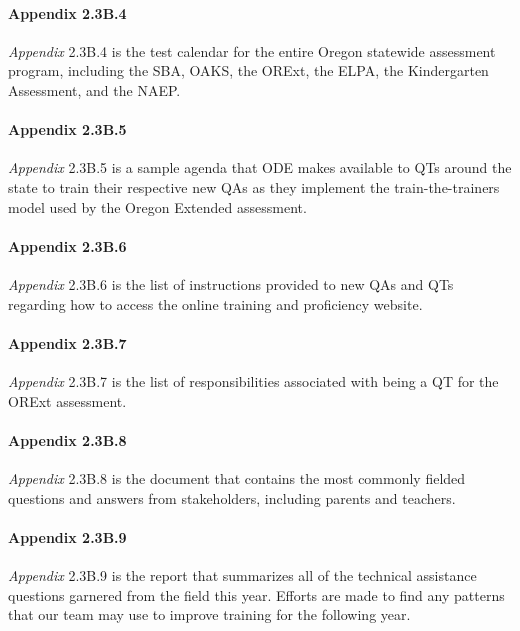 \documentclass[]{article}
\let\oldparagraph\paragraph
\renewcommand{\paragraph}[1]{\oldparagraph{#1}\mbox{}}
\begin{document}
\paragraph{Appendix 2.3B.4}\label{appendix-2.3b.4}

\emph{Appendix} 2.3B.4 is the test calendar for the entire Oregon
statewide assessment program, including the SBA, OAKS, the ORExt, the
ELPA, the Kindergarten Assessment, and the NAEP.

\paragraph{Appendix 2.3B.5}\label{appendix-2.3b.5}

\emph{Appendix} 2.3B.5 is a sample agenda that ODE makes available to
QTs around the state to train their respective new QAs as they implement
the train-the-trainers model used by the Oregon Extended assessment.

\paragraph{Appendix 2.3B.6}\label{appendix-2.3b.6}

\emph{Appendix} 2.3B.6 is the list of instructions provided to new QAs
and QTs regarding how to access the online training and proficiency
website.

\paragraph{Appendix 2.3B.7}\label{appendix-2.3b.7}

\emph{Appendix} 2.3B.7 is the list of responsibilities associated with
being a QT for the ORExt assessment.

\paragraph{Appendix 2.3B.8}\label{appendix-2.3b.8}

\emph{Appendix} 2.3B.8 is the document that contains the most commonly
fielded questions and answers from stakeholders, including parents and
teachers.

\paragraph{Appendix 2.3B.9}\label{appendix-2.3b.9}

\emph{Appendix} 2.3B.9 is the report that summarizes all of the
technical assistance questions garnered from the field this year.
Efforts are made to find any patterns that our team may use to improve
training for the following year.
\end{document}
